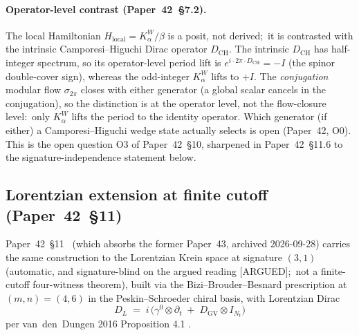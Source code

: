 \documentclass[11pt,a4paper]{article}
\theoremstyle{plain}
\theoremstyle{definition}
\newcommand{\Nt}{N_{t}}
\newcommand{\DGV}{D_{\mathrm{GV}}}
\newcommand{\DCH}{D_{\mathrm{CH}}}
\newcommand{\DL}{D_{L}}
\begin{document}
\paragraph{Operator-level contrast (Paper~42~\S 7.2).}
The local Hamiltonian $H_{\mathrm{local}} = K_{\alpha}^{W} / \beta$ is
a posit, not derived;\ it is contrasted with the intrinsic
Camporesi--Higuchi Dirac operator $\DCH$.  The intrinsic
$\DCH$ has half-integer spectrum, so its operator-level period lift is
$e^{i \cdot 2\pi \cdot \DCH} = -I$ (the spinor double-cover sign),
whereas the odd-integer $K_{\alpha}^{W}$ lifts to $+I$.  The
\emph{conjugation} modular flow $\sigma_{2\pi}$ closes with either
generator (a global scalar cancels in the conjugation), so the
distinction is at the operator level, not the flow-closure level:\
only $K_{\alpha}^{W}$ lifts the period to the identity operator.
Which generator (if either) a Camporesi--Higuchi wedge state actually
selects is open (Paper~42, O0).
This is the open question O3 of Paper~42~\S 10, sharpened in
Paper~42~\S 11.6 to the signature-independence statement below.

\subsection{Lorentzian extension at finite cutoff (Paper~42~\S 11)}

Paper~42~\S 11~\cite{paper42} (which absorbs the former Paper~43, archived
2026-09-28) carries the same construction to the
Lorentzian Krein space at signature $(3,1)$ (automatic, and
signature-blind on the argued reading [ARGUED];\ not a finite-cutoff four-witness theorem), built via the
Bizi--Brouder--Besnard prescription \cite{bizi_brouder_besnard2018}
at $(m,n) = (4,6)$ in the Peskin--Schroeder chiral basis, with
Lorentzian Dirac
\begin{equation}
\DL \;=\; i\,\bigl(\gamma^{0} \otimes \partial_{t}
\;+\; \DGV \otimes I_{\Nt}\bigr)
\label{eq:lorentzian_dirac}
\end{equation}
per van~den~Dungen 2016 Proposition 4.1 \cite{vandungen2016}.
\end{document}
